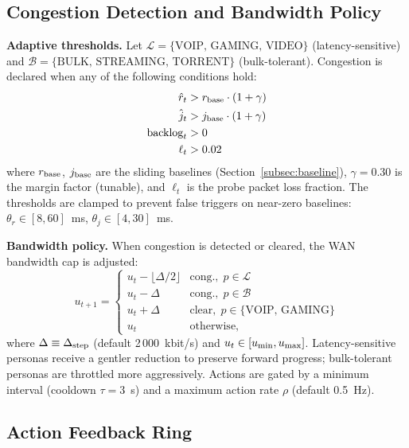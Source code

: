 \documentclass[conference]{IEEEtran}
\begin{document}
\subsection{Congestion Detection and Bandwidth Policy}

\textbf{Adaptive thresholds.}
Let $\mathcal{L}=\{\text{VOIP, GAMING, VIDEO}\}$ (latency-sensitive) and
$\mathcal{B}=\{\text{BULK, STREAMING, TORRENT}\}$ (bulk-tolerant).
Congestion is declared when any of the following conditions hold:
\begin{align}
  \hat{r}_t &> r_{\rm base}\cdot(1+\gamma) \label{eq:rtt_cong}\\
  \hat{j}_t &> j_{\rm base}\cdot(1+\gamma) \label{eq:jit_cong}\\
  \text{backlog}_t &> 0 \label{eq:bl_cong}\\
  \ell_t &> 0.02 \label{eq:loss_cong}
\end{align}
where $r_{\rm base}$, $j_{\rm base}$ are the sliding baselines
(Section~\ref{subsec:baseline}), $\gamma=0.30$ is the margin factor
(tunable), and $\ell_t$ is the probe packet loss fraction.
The thresholds are clamped to prevent false triggers on near-zero baselines:
$\theta_r \in [8, 60]$~ms, $\theta_j \in [4, 30]$~ms.

\textbf{Bandwidth policy.}
When congestion is detected or cleared, the WAN bandwidth cap is adjusted:
\begin{equation}
  u_{t+1} =
  \begin{cases}
    u_t - \lfloor\Delta/2\rfloor & \text{cong.},\; p \in \mathcal{L} \\
    u_t - \Delta                 & \text{cong.},\; p \in \mathcal{B} \\
    u_t + \Delta                 & \text{clear},\; p \in \{\text{VOIP, GAMING}\} \\
    u_t                          & \text{otherwise,}
  \end{cases}
  \label{eq:policy}
\end{equation}
where $\Delta \equiv \Delta_{\rm step}$ (default 2\,000~kbit/s) and
$u_t \in [u_{\rm min}, u_{\rm max}]$.
Latency-sensitive personas receive a gentler reduction to preserve
forward progress; bulk-tolerant personas are throttled more aggressively.
Actions are gated by a minimum interval (cooldown $\tau = 3$~s) and a
maximum action rate $\rho$ (default 0.5~Hz).

\subsection{Action Feedback Ring}
\end{document}

